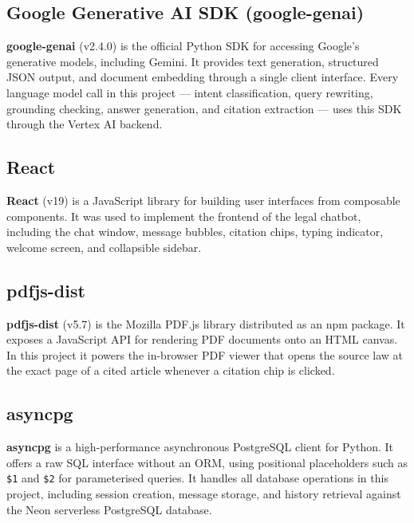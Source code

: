 \subsection{Google Generative AI SDK (google-genai)}
\textbf{google-genai} (v2.4.0) is the official Python SDK for accessing Google's
generative models, including Gemini. It provides text generation, structured JSON output,
and document embedding through a single client interface. Every language model call in
this project — intent classification, query rewriting, grounding checking, answer
generation, and citation extraction — uses this SDK through the Vertex AI backend.

\subsection{React}
\textbf{React} (v19) is a JavaScript library for building user interfaces from
composable components. It was used to implement the frontend of the legal chatbot,
including the chat window, message bubbles, citation chips, typing indicator, welcome
screen, and collapsible sidebar.

\newpage
\subsection{pdfjs-dist}
\textbf{pdfjs-dist} (v5.7) is the Mozilla PDF.js library distributed as an npm package.
It exposes a JavaScript API for rendering PDF documents onto an HTML canvas. In this
project it powers the in-browser PDF viewer that opens the source law at the exact page of
a cited article whenever a citation chip is clicked.

\subsection{asyncpg}
\textbf{asyncpg} is a high-performance asynchronous PostgreSQL client for Python. It
offers a raw SQL interface without an ORM, using positional placeholders such as
\texttt{\$1} and \texttt{\$2} for parameterised queries. It handles all database
operations in this project, including session creation, message storage, and history
retrieval against the Neon serverless PostgreSQL database.

